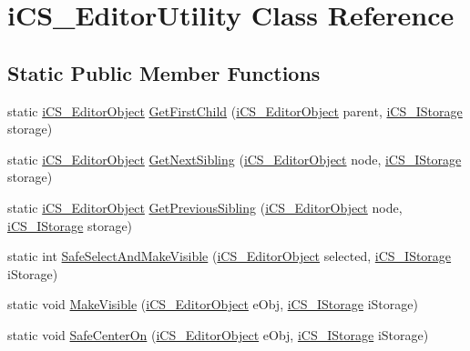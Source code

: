 \hypertarget{classi_c_s___editor_utility}{\section{i\+C\+S\+\_\+\+Editor\+Utility Class Reference}
\label{classi_c_s___editor_utility}
}
\subsection*{Static Public Member Functions}
\begin{DoxyCompactItemize}
\item 
static \hyperlink{classi_c_s___editor_object}{i\+C\+S\+\_\+\+Editor\+Object} \hyperlink{classi_c_s___editor_utility_a09d99c934a007b9775482712d60a6944}{Get\+First\+Child} (\hyperlink{classi_c_s___editor_object}{i\+C\+S\+\_\+\+Editor\+Object} parent, \hyperlink{classi_c_s___i_storage}{i\+C\+S\+\_\+\+I\+Storage} storage)
\item 
static \hyperlink{classi_c_s___editor_object}{i\+C\+S\+\_\+\+Editor\+Object} \hyperlink{classi_c_s___editor_utility_a89c7935d4932fc54dc8c7704ca1686c9}{Get\+Next\+Sibling} (\hyperlink{classi_c_s___editor_object}{i\+C\+S\+\_\+\+Editor\+Object} node, \hyperlink{classi_c_s___i_storage}{i\+C\+S\+\_\+\+I\+Storage} storage)
\item 
static \hyperlink{classi_c_s___editor_object}{i\+C\+S\+\_\+\+Editor\+Object} \hyperlink{classi_c_s___editor_utility_a5d887c3564a1398e3c7349828fcd8407}{Get\+Previous\+Sibling} (\hyperlink{classi_c_s___editor_object}{i\+C\+S\+\_\+\+Editor\+Object} node, \hyperlink{classi_c_s___i_storage}{i\+C\+S\+\_\+\+I\+Storage} storage)
\item 
static int \hyperlink{classi_c_s___editor_utility_a65452780f8f9ef80c891869dd7aaadbf}{Safe\+Select\+And\+Make\+Visible} (\hyperlink{classi_c_s___editor_object}{i\+C\+S\+\_\+\+Editor\+Object} selected, \hyperlink{classi_c_s___i_storage}{i\+C\+S\+\_\+\+I\+Storage} i\+Storage)
\item 
static void \hyperlink{classi_c_s___editor_utility_a78e18756877f30b9916da17f63e4bab0}{Make\+Visible} (\hyperlink{classi_c_s___editor_object}{i\+C\+S\+\_\+\+Editor\+Object} e\+Obj, \hyperlink{classi_c_s___i_storage}{i\+C\+S\+\_\+\+I\+Storage} i\+Storage)
\item 
static void \hyperlink{classi_c_s___editor_utility_a0615f5eab7791626bef5476ac9e116f6}{Safe\+Center\+On} (\hyperlink{classi_c_s___editor_object}{i\+C\+S\+\_\+\+Editor\+Object} e\+Obj, \hyperlink{classi_c_s___i_storage}{i\+C\+S\+\_\+\+I\+Storage} i\+Storage)

\end{DoxyCompactItemize}
